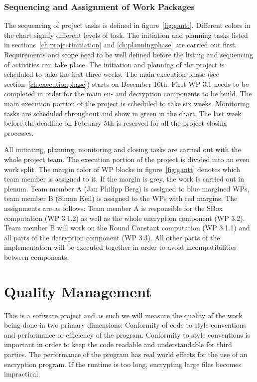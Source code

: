 \subsubsection{Sequencing and Assignment of Work Packages}
\label{ch:sequencingandassignment}

The sequencing of project tasks is defined in figure~\ref{fig:gantt}. Different colors in the chart signify different levels of task. The initiation and planning tasks listed in sections~\ref{ch:projectinitiation} and \ref{ch:planningphase} are carried out first. Requirements and scope need to be well defined before the listing and sequencing of activities can take place. The initiation and planning of the project is scheduled to take the first three weeks. The main execution phase (see section~\ref{ch:executionphase}) starts on December 10th. First \ac{WP} 3.1 needs to be completed in order for the main en- and decryption components to be build. The main execution portion of the project is scheduled to take six weeks. Monitoring tasks are scheduled throughout and show in green in the chart. The last week before the deadline on February 5th is reserved for all the project closing processes.

All initiating, planning, monitoring and closing tasks are carried out with the whole project team. The execution portion of the project is divided into an even work split. The margin color of \ac{WP} blocks in figure~\ref{fig:gantt} denotes which team member is assigned to it. If the margin is grey, the work is carried out in plenum. Team member A (Jan Philipp Berg) is assigned to blue margined \ac{WP}s, team member B (Simon Keil) is assigned to the \ac{WP}s with red margins. The assignments are as follows: Team member A is responsible for the SBox computation (\ac{WP} 3.1.2) as well as the whole encryption component (\ac{WP} 3.2). Team member B will work on the Round Constant computation (\ac{WP} 3.1.1) and all parts of the decryption component (\ac{WP} 3.3). All other parts of the implementation will be executed together in order to avoid incompatibilities between components.


\section{Quality Management}
\label{ch:qualitymanagement}
This is a software project and as such we will measure the quality of the work being done in two primary dimensions: Conformity of code to style conventions and performance or efficiency of the program. Conformity to style conventions is important in order to keep the code readable and understandable for third parties. The performance of the program has real world effects for the use of an encryption program. If the runtime is too long, encrypting large files becomes impractical.

